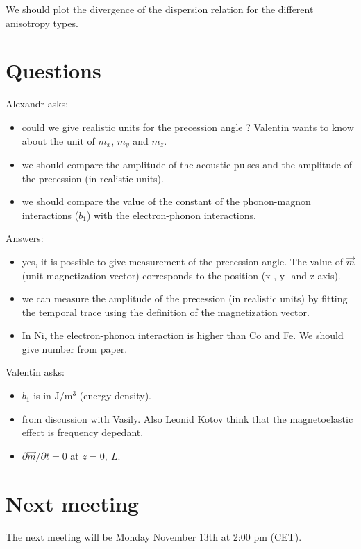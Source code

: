 \documentclass[12pt,a4paper]{article}
\begin{document}
We should plot the divergence of the dispersion relation for the different anisotropy types.

\section{Questions}

Alexandr asks:
\begin{itemize}
    \item could we give realistic units for the precession angle ? Valentin wants to know about the unit of $m_x$, $m_y$ and $m_z$.
    \item we should compare the amplitude of the acoustic pulses and the amplitude of the precession (in realistic units).
    \item we should compare the value of the constant of the phonon-magnon interactions ($b_1$) with the electron-phonon interactions.
\end{itemize}

Answers:
\begin{itemize}
    \item yes, it is possible to give measurement of the precession angle. The value of $\vec{m}$ (unit magnetization vector) corresponds to the position (x-, y- and z-axis). 
    \item we can measure the amplitude of the precession (in realistic units) by fitting the temporal trace using the definition of the magnetization vector.
    \item In Ni, the electron-phonon interaction is higher than Co and Fe. We should give number from paper.
\end{itemize}

Valentin asks:
\begin{itemize}
    \item $b_1$ is in $\mathrm{J}/\mathrm{m}^3$ (energy density).
    \item from discussion with Vasily. Also Leonid Kotov think that the magnetoelastic effect is frequency depedant.
    \item $\partial \vec{m} / \partial t = 0$ at $z = 0,\ L$.
\end{itemize}

\section*{Next meeting}

The next meeting will be Monday November 13th at 2:00 pm (CET).
\end{document}
